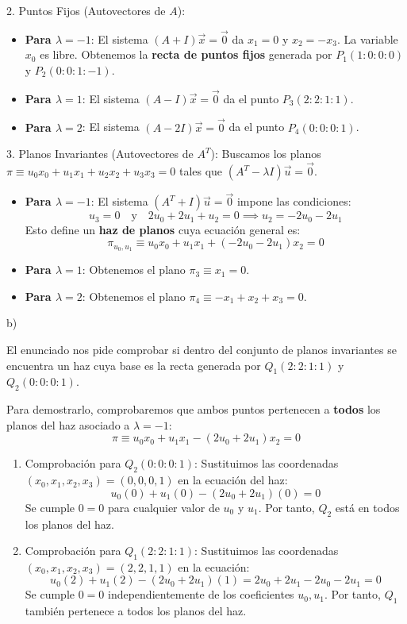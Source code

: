 {2. Puntos Fijos (Autovectores de $A$):
\begin{itemize}
    \item \textbf{Para $\lambda = -1$}: El sistema $(A+I)\vec{x} = \vec{0}$ da $x_1 = 0$ y $x_2 = -x_3$. La variable $x_0$ es libre. Obtenemos la \textbf{recta de puntos fijos} generada por $P_1(1:0:0:0)$ y $P_2(0:0:1:-1)$.
    \item \textbf{Para $\lambda = 1$}: El sistema $(A-I)\vec{x} = \vec{0}$ da el punto \textbf{$P_3(2:2:1:1)$}.
    \item \textbf{Para $\lambda = 2$}: El sistema $(A-2I)\vec{x} = \vec{0}$ da el punto \textbf{$P_4(0:0:0:1)$}.
\end{itemize}
3. Planos Invariantes (Autovectores de $A^T$):
Buscamos los planos $\pi \equiv u_0x_0 + u_1x_1 + u_2x_2 + u_3x_3 = 0$ tales que $(A^T - \lambda I)\vec{u} = \vec{0}$.
\begin{itemize}
    \item \textbf{Para $\lambda = -1$}: El sistema $(A^T+I)\vec{u} = \vec{0}$ impone las condiciones:
    \[ u_3 = 0 \quad \text{y} \quad 2u_0 + 2u_1 + u_2 = 0 \implies u_2 = -2u_0 - 2u_1 \]
    Esto define un \textbf{haz de planos} cuya ecuación general es:
    \[ \pi_{u_0, u_1} \equiv u_0x_0 + u_1x_1 + (-2u_0 - 2u_1)x_2 = 0 \]
    \item \textbf{Para $\lambda = 1$}: Obtenemos el plano \textbf{$\pi_3 \equiv x_1 = 0$}.
    \item \textbf{Para $\lambda = 2$}: Obtenemos el plano \textbf{$\pi_4 \equiv -x_1 + x_2 + x_3 = 0$}.
\end{itemize}

b) 

El enunciado nos pide comprobar si dentro del conjunto de planos invariantes se encuentra un haz cuya base es la recta generada por $Q_1(2:2:1:1)$ y $Q_2(0:0:0:1)$. 

Para demostrarlo, comprobaremos que ambos puntos pertenecen a \textbf{todos} los planos del haz asociado a $\lambda = -1$:
\[ \pi \equiv u_0x_0 + u_1x_1 - (2u_0 + 2u_1)x_2 = 0 \]

\begin{enumerate}
    \item Comprobación para $Q_2(0:0:0:1)$:
    Sustituimos las coordenadas $(x_0, x_1, x_2, x_3) = (0, 0, 0, 1)$ en la ecuación del haz:
    \[ u_0(0) + u_1(0) - (2u_0 + 2u_1)(0) = 0 \]
    Se cumple $0=0$ para cualquier valor de $u_0$ y $u_1$. Por tanto, $Q_2$ está en todos los planos del haz.
    
    \item Comprobación para $Q_1(2:2:1:1)$:
    Sustituimos las coordenadas $(x_0, x_1, x_2, x_3) = (2, 2, 1, 1)$ en la ecuación:
    \[ u_0(2) + u_1(2) - (2u_0 + 2u_1)(1) = 2u_0 + 2u_1 - 2u_0 - 2u_1 = 0 \]
    Se cumple $0=0$ independientemente de los coeficientes $u_0, u_1$. Por tanto, $Q_1$ también pertenece a todos los planos del haz.
\end{enumerate}

}
